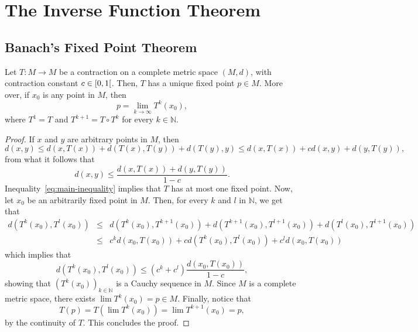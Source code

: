 \chapter{The Inverse Function Theorem}\label{chp:the_inverse_function_theorem}

\section{Banach's Fixed Point Theorem}\label{sec:banach_s_fixed_point_theorem}

\begin{theorem}\label{thm:banach's fixed point theorem}
  Let \(T:{M}\to{M}\) be a contraction on a complete metric space \((M,d)\), with contraction constant \({c}\in{\rinterval{0}{1}}\). Then, \(T\) has a unique fixed point \({p}\in{M}\). More over, if \(x_{0}\) is any point in \(M\), then \[p=\lim_{k\to\infty}T^{k}(x_{0}),\] where \(T^{1}=T\) and \(T^{k+1}=T\circ{T^{k}}\) for every \({k}\in{\mathbb{N}}\).
\end{theorem}

\begin{proof}
  If \(x\) and \(y\) are arbitrary points in \(M\), then
  \[
    d(x,y)
    \leqslant
    d(x,T(x)) + d(T(x),T(y)) + d(T(y),y)
    \leqslant
    d(x,T(x)) + cd(x,y) + d(y,T(y)),
  \]
  from what it follows that
  \begin{equation}\label{eq:main-inequality}
    d(x,y)
    \leqslant
    \frac{d(x,T(x)) + d(y,T(y))}{1 - c}.
  \end{equation}
  Inequality~\eqref{eq:main-inequality} implies that \(T\) has at most one fixed point. Now, let \(x_{0}\) be an arbitrarily fixed point in \(M\). Then, for every \(k\) and \(l\) in \(\mathbb{N}\), we get that
  \[
    \begin{array}{rcl}
      d(T^{k}(x_{0}),T^{l}(x_{0}))
      &\leqslant&
      d(T^{k}(x_{0}),T^{k+1}(x_{0}))
      +
      d(T^{k+1}(x_{0}),T^{l+1}(x_{0}))
      +
      d(T^{l}(x_{0}),T^{l+1}(x_{0}))
      \\
      &\leqslant&
      c^{k}d(x_{0},T(x_{0}))
      +
      cd(T^{k}(x_{0}),T^{l}(x_{0}))
      +
      c^{l}d(x_{0},T(x_{0}))
    \end{array}
  \]
  which implies that
  \begin{equation}\label{eq:the-sequence-of-iterates-is-cauchy}
    d(T^{k}(x_{0}),T^{l}(x_{0}))
    \leqslant
    (c^{k}+c^{l})\frac{d(x_{0},T(x_{0}))}{1-c},
  \end{equation}
  showing that \(\left(T^{k}(x_{0})\right)_{{k}\in{\mathbb{N}}}\) is a Cauchy sequence in \(M\). Since \(M\) is a complete metric space, there exists \(\lim{T^{k}(x_{0})}=p\in{M}\). Finally, notice that
  \[
    T(p)=T(\lim{T^{k}(x_{0})})=\lim{T^{k+1}(x_{0})}=p,
  \]
  by the continuity of \(T\). This concludes the proof.
\end{proof}

